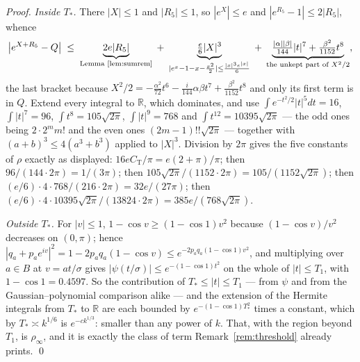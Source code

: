\documentclass[11pt,a4paper]{article}
\theoremstyle{plain}
\theoremstyle{definition}
\theoremstyle{remark}
\begin{document}
\begin{proof}
\medskip\noindent
\emph{Inside $T_{*}$.} There $|X|\le1$ and $|R_5|\le1$, so $|e^{X}|\le e$ and
$|e^{R_5}-1|\le2|R_5|$, whence
\[
  \bigl|e^{X+R_5}-Q\bigr|\;\le\;
  \underbrace{2e|R_5|}_{\text{Lemma~\ref{lem:sumrem}}}
  \;+\;\underbrace{\tfrac{e}{6}|X|^{3}}_{|e^{x}-1-x-\frac{x^{2}}{2}|\le\frac{|x|^{3}e^{|x|}}{6}}
  \;+\;\underbrace{\tfrac{|\alpha||\beta|}{144}|t|^{7}+\tfrac{\beta^{2}}{1152}t^{8}}_{
     \text{the unkept part of }X^{2}/2},
\]
the last bracket because $X^{2}/2=-\tfrac{\alpha^{2}}{72}t^{6}
-\tfrac{i}{144}\alpha\beta t^{7}+\tfrac{\beta^{2}}{1152}t^{8}$ and only its first term is in
$Q$. Extend every integral to $\mathbb{R}$, which dominates, and use
$\int e^{-t^{2}/2}|t|^{5}dt=16$, $\int|t|^{7}=96$, $\int t^{8}=105\sqrt{2\pi}$,
$\int|t|^{9}=768$ and $\int t^{12}=10395\sqrt{2\pi}$ --- the odd ones being $2\cdot2^{m}m!$ and
the even ones $(2m-1)!!\sqrt{2\pi}$ --- together with $(a+b)^{3}\le4(a^{3}+b^{3})$ applied to
$|X|^{3}$. Division by $2\pi$ gives the five constants of $\rho$ exactly as displayed:
$16eC_{\mathrm{T}}/\pi=e(2+\pi)/\pi$; then $96/(144\cdot2\pi)=1/(3\pi)$; then
$105\sqrt{2\pi}/(1152\cdot2\pi)=105/(1152\sqrt{2\pi})$; then
$(e/6)\cdot4\cdot768/(216\cdot2\pi)=32e/(27\pi)$; then
$(e/6)\cdot4\cdot10395\sqrt{2\pi}/(13824\cdot2\pi)=385e/(768\sqrt{2\pi})$.

\medskip\noindent
\emph{Outside $T_{*}$.} For $|v|\le1$, $1-\cos v\ge(1-\cos1)v^{2}$ because $(1-\cos v)/v^{2}$
decreases on $(0,\pi)$; hence $|q_a+p_ae^{iv}|^{2}=1-2p_aq_a(1-\cos v)
\le e^{-2p_aq_a(1-\cos1)v^{2}}$, and multiplying over $a\in B$ at $v=at/\sigma$ gives
$|\psi(t/\sigma)|\le e^{-(1-\cos1)t^{2}}$ on the whole of $|t|\le T_1$, with
$1-\cos1=0.4597$. So the contribution of $T_{*}\le|t|\le T_1$ --- from $\psi$ and from the
Gaussian--polynomial comparison alike --- and the extension of the Hermite integrals from
$T_{*}$ to $\mathbb{R}$ are each bounded by $e^{-(1-\cos1)T_{*}^{2}}$ times a constant, which
by $T_{*}\asymp k^{1/6}$ is $e^{-ck^{1/3}}$: smaller than any power of $k$. That, with the
region beyond $T_1$, is $\rho_{\infty}$, and it is exactly the class of term
Remark~\ref{rem:threshold} already prints. \qed
\end{proof}
\end{document}
